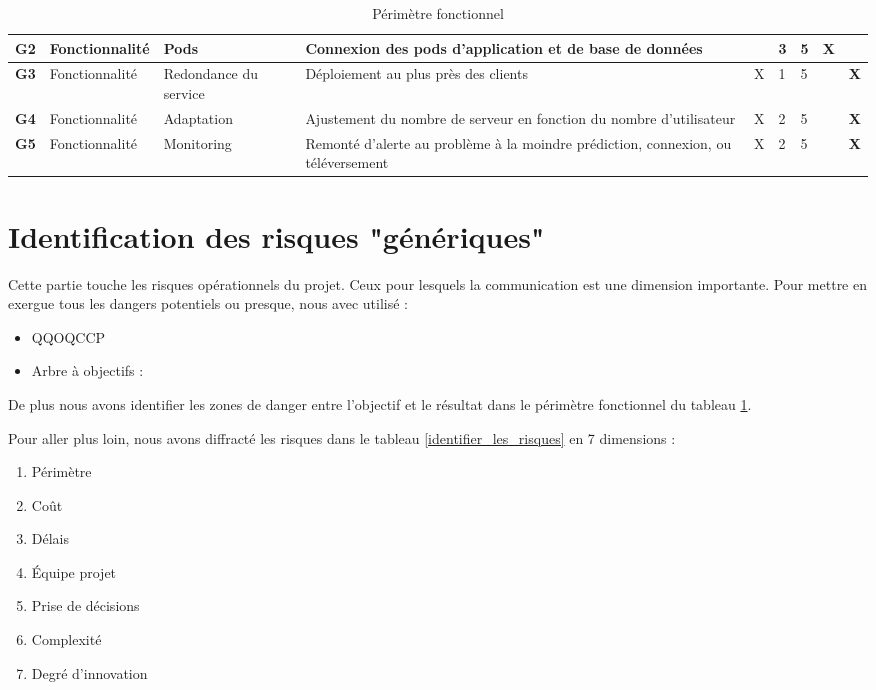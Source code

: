 \documentclass[12pt]{article}
\begin{document}
\begin{landscape}
\begin{table}[H]
{\begin{tabular}{p{1cm}p{2cm}p{3cm}p{10cm}p{1.75cm}p{1.5cm}p{1.25cm}p{.5cm}p{.5cm}}
\hline  	\bf G2& Fonctionnalité & Pods & Connexion des pods d’application et de base de données &  & 3 & 5 & \bf X &  \\
\hline  	\bf G3& Fonctionnalité & Redondance du service & Déploiement au plus près des clients & X & 1 & 5 &  & \bf X \\
\hline  	\bf G4& Fonctionnalité & Adaptation & Ajustement du nombre de serveur en fonction du nombre d’utilisateur & X & 2 & 5 & & \bf X \\
\hline  	\bf G5& Fonctionnalité & Monitoring & Remonté d’alerte au problème à la moindre prédiction, connexion, ou téléversement & X & 2 & 5 & & \bf X \\

\hline
\end{tabular}
}
\caption{Périmètre fonctionnel}
\label{functional_perimeter}
\end{table}
\end{landscape}


\section{Identification des risques "génériques"}
Cette partie touche les risques opérationnels du projet. Ceux pour lesquels la communication est une dimension importante. Pour mettre en exergue tous les dangers potentiels ou presque, nous avec utilisé :
\begin{itemize}
	\item QQOQCCP
	\item Arbre à objectifs : 
\end{itemize}

De plus nous avons identifier les zones de danger entre l’objectif et le résultat dans le périmètre fonctionnel du tableau \ref{functional_perimeter}. 

Pour aller plus loin, nous avons diffracté les risques dans le tableau \ref{identifier_les_risques} en 7 dimensions :
\begin{enumerate}
	\item Périmètre
	\item Coût
	\item Délais
	\item Équipe projet
	\item Prise de décisions
	\item Complexité
	\item Degré d’innovation
\end{enumerate}
\end{document}
